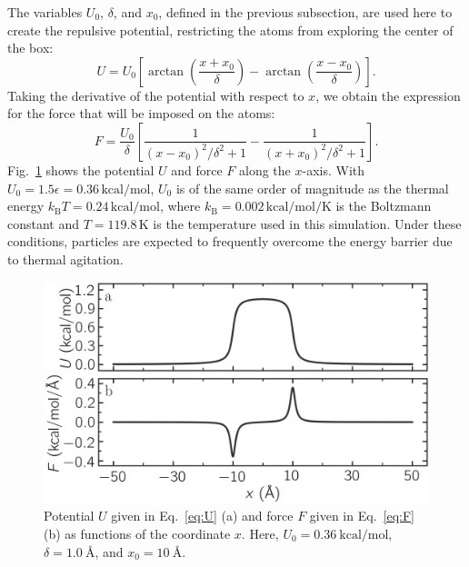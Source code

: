 \documentclass[9pt,tutorial]{livecoms}
\begin{document}
The variables $U_0$, $\delta$, and $x_0$, defined in the previous subsection, are
used here to create the repulsive potential, restricting the atoms from exploring
the center of the box:
\begin{equation}
U = U_0 \left[ \arctan \left( \dfrac{x+x_0}{\delta} \right)
- \arctan \left(\dfrac{x-x_0}{\delta} \right) \right].
\label{eq:U}
\end{equation}
Taking the derivative of the potential with respect to $x$, we obtain the expression
for the force that will be imposed on the atoms:
\begin{equation}
F = \dfrac{U_0}{\delta} \left[ \dfrac{1}{(x-x_0)^2/\delta^2+1}
- \dfrac{1}{(x+x_0)^2/\delta^2+1} \right].
\label{eq:F}
\end{equation}
Fig.~\ref{fig:potential} shows the potential $U$ and force $F$ along the $x$-axis.
With $U_0 = 1.5 \epsilon = 0.36\,\text{kcal/mol}$, $U_0$ is of the same order of magnitude as the
thermal energy $k_\text{B} T = 0.24\,\text{kcal/mol}$, where $k_\text{B} = 0.002\,\text{kcal/mol/K}$
is the Boltzmann constant and $T = 119.8\,\text{K}$ is the temperature
used in this simulation.  Under these conditions, particles are expected to
frequently overcome the energy barrier due to thermal agitation.

\begin{figure}
\centering
\includegraphics[width=\linewidth]{US-potential}
\caption{Potential $U$ given in Eq.~\eqref{eq:U} (a) and force $F$ given in
Eq.~\eqref{eq:F} (b) as functions of the coordinate $x$. Here,
$U_0 = 0.36~\text{kcal/mol}$, $\delta = 1.0~\text{\AA{}}$, and $x_0 = 10~\text{\AA{}}$.}
\label{fig:potential}
\end{figure}
\end{document}
